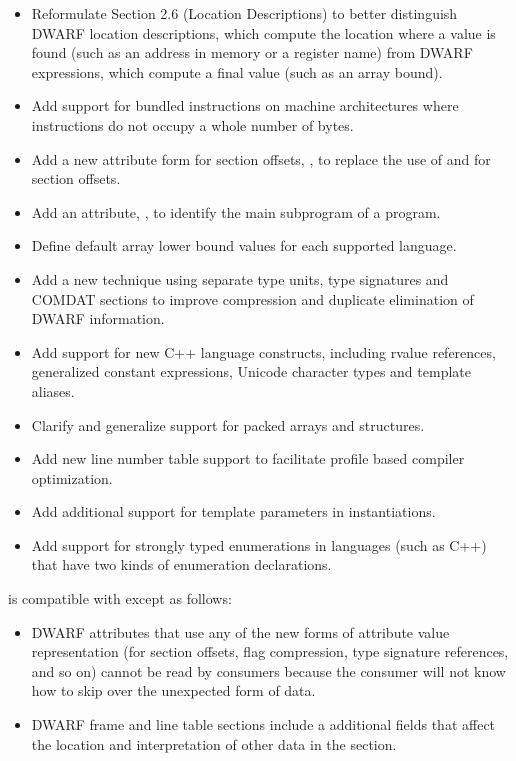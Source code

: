 \begin{itemize}

\item Reformulate 
Section 2.6 (Location Descriptions) 
to better distinguish DWARF location descriptions, which
compute the location where a value is found (such as an address in memory or a register
name) from DWARF expressions, which compute a final value (such as an array bound).
\item Add support for bundled instructions on machine architectures where instructions do not
occupy a whole number of bytes.
\item Add a new attribute form for 
section offsets, , 
to replace the use
of  and  for section offsets.
\item Add an attribute, , to identify the main subprogram of a
program.
\item Define default array lower bound values for each supported language.
\item Add a new technique using separate type units, type signatures and COMDAT sections to
improve compression and duplicate elimination of DWARF information.
\item Add support for new C++ language constructs, including rvalue references, generalized
constant expressions, Unicode character types and template aliases.
\item Clarify and generalize support for packed arrays and structures.
\item Add new line number table support to facilitate profile based compiler optimization.
\item Add additional support for template parameters in instantiations.
\item Add support for strongly typed enumerations in languages (such as C++) that have two
kinds of enumeration declarations.
\end{itemize}
 is compatible with 
 except as follows:
\begin{itemize}
\item DWARF attributes that use any of the new forms of attribute value representation (for
section offsets, flag compression, type signature references, and so on) cannot be read by
consumers because the consumer will not know how to skip over the
unexpected form of data.
\item DWARF frame and line table sections include a additional fields that affect the location
and interpretation of other data in the section.
\end{itemize}

